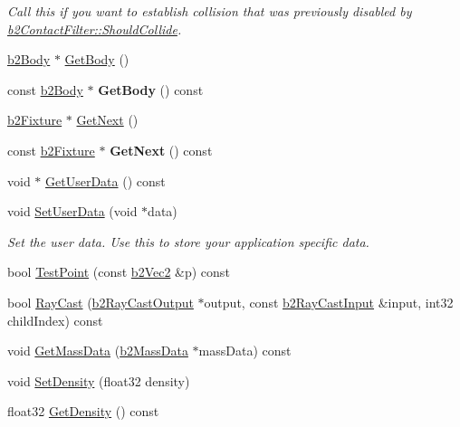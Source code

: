 \begin{DoxyCompactItemize}
\begin{DoxyCompactList}\small\item\em Call this if you want to establish collision that was previously disabled by \hyperlink{classb2_contact_filter_aac8f6155d1f577d125db587f5269289b}{b2\-Contact\-Filter\-::\-Should\-Collide}. \end{DoxyCompactList}\item 
\hyperlink{classb2_body}{b2\-Body} $\ast$ \hyperlink{classb2_fixture_a9d6536ef274d768e86ab0a8330921535}{Get\-Body} ()
\item 
\hypertarget{classb2_fixture_a6cfc4ed94c4cbfbc0244f11007448431}{const \hyperlink{classb2_body}{b2\-Body} $\ast$ {\bfseries Get\-Body} () const }\label{classb2_fixture_a6cfc4ed94c4cbfbc0244f11007448431}

\item 
\hyperlink{classb2_fixture}{b2\-Fixture} $\ast$ \hyperlink{classb2_fixture_a0241952461f6f1a04a3c850306390fd2}{Get\-Next} ()
\item 
\hypertarget{classb2_fixture_adb72f9669165143466a1d37d1288785f}{const \hyperlink{classb2_fixture}{b2\-Fixture} $\ast$ {\bfseries Get\-Next} () const }\label{classb2_fixture_adb72f9669165143466a1d37d1288785f}

\item 
void $\ast$ \hyperlink{classb2_fixture_a57247425e7c859d7653eec417ec83cdc}{Get\-User\-Data} () const 
\item 
\hypertarget{classb2_fixture_a3db7f89ef4493247d922fe3d96351ad9}{void \hyperlink{classb2_fixture_a3db7f89ef4493247d922fe3d96351ad9}{Set\-User\-Data} (void $\ast$data)}\label{classb2_fixture_a3db7f89ef4493247d922fe3d96351ad9}

\begin{DoxyCompactList}\small\item\em Set the user data. Use this to store your application specific data. \end{DoxyCompactList}\item 
bool \hyperlink{classb2_fixture_ab875147c7a9df4ff94d224f6aa81a7a9}{Test\-Point} (const \hyperlink{structb2_vec2}{b2\-Vec2} \&p) const 
\item 
bool \hyperlink{classb2_fixture_a614e84f47e8b32b503fa719099ecba79}{Ray\-Cast} (\hyperlink{structb2_ray_cast_output}{b2\-Ray\-Cast\-Output} $\ast$output, const \hyperlink{structb2_ray_cast_input}{b2\-Ray\-Cast\-Input} \&input, int32 child\-Index) const 
\item 
void \hyperlink{classb2_fixture_adbfb9b64006abaaa0ca01e6d9e06deea}{Get\-Mass\-Data} (\hyperlink{structb2_mass_data}{b2\-Mass\-Data} $\ast$mass\-Data) const 
\item 
void \hyperlink{classb2_fixture_ad4e1d9323103975c8931d022b952d04a}{Set\-Density} (float32 density)
\item 
\hypertarget{classb2_fixture_a5deb4acfb464f3dcb668f081a2c44ff4}{float32 \hyperlink{classb2_fixture_a5deb4acfb464f3dcb668f081a2c44ff4}{Get\-Density} () const }\label{classb2_fixture_a5deb4acfb464f3dcb668f081a2c44ff4}


\end{DoxyCompactItemize}
